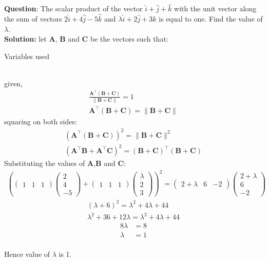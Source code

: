 \documentclass[journal]{IEEEtran}
\begin{document}
\textbf{Question}:
The scalar product of the vector $\hat{i}+\hat{j}+\hat{k}$ with the unit vector along the sum of vectors $2\hat{i} + 4\hat{j} - 5\hat{k}$ and $\lambda \hat{i} + 2\hat{j} + 3\hat{k}$ is equal to one. Find the value of $\lambda$.\\
\textbf{Solution: }
let $\mathbf{A}$, $\mathbf{B}$ and $\mathbf{C}$ be the vectors such that:
\begin{table}[h!]
    \centering
    
    \caption{Variables used}
    \label{table 1.9.1}
\end{table}\\
given,
\begin{align}
 \frac{\mathbf{A^\top} (\mathbf{B}+\mathbf{C})}{\|\mathbf{B}+\mathbf{C}\|} = 1\\
\mathbf{A^\top} (\mathbf{B}+\mathbf{C}) = \|\mathbf{B}+\mathbf{C}\|
\end{align}
squaring on both sides:
\begin{align}
(\mathbf{A^\top} (\mathbf{B}+\mathbf{C}))^2 = \|\mathbf{B}+\mathbf{C}\|^2 \\
(\mathbf{A^\top}  \mathbf{B} + \mathbf{A^\top}  \mathbf{C})^2 = (\mathbf{B}+\mathbf{C})^\top(\mathbf{B}+\mathbf{C})
\end{align}
 Substituting the values of \textbf{A},\textbf{B} and \textbf{C}: 
\begin{align}
\left(\begin{pmatrix}1 & 1 & 1\end{pmatrix} \begin{pmatrix}2 \\4 \\-5\end{pmatrix}+\begin{pmatrix}1 & 1 & 1\end{pmatrix} \begin{pmatrix}\lambda \\2 \\3\end{pmatrix}\right)^2=
\begin{pmatrix}2+\lambda & 6 & -2\end{pmatrix}\begin{pmatrix}2+\lambda \\6 \\-2\end{pmatrix}
\end{align}
\begin{align}
(\lambda+6)^2 = \lambda^2 
+ 4\lambda+44\\
\lambda^2 + 36 + 12\lambda = \lambda^2 + 4\lambda + 44  
\end{align}
\begin{align}8\lambda &= 8 \\\lambda &= 1\end{align}\\
Hence value of $\lambda$ is 1.
\end{document}
